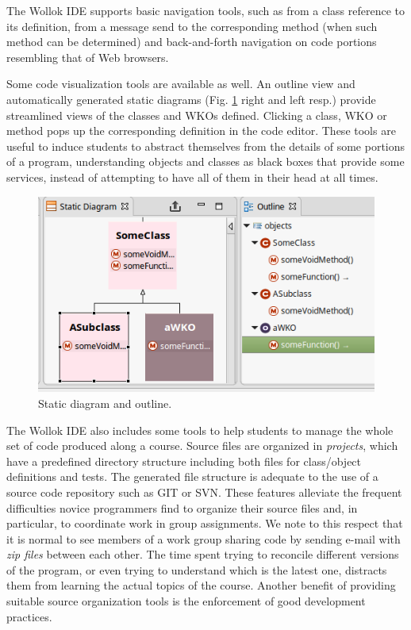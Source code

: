 The Wollok IDE supports basic navigation tools, such as from a class reference to its definition, from a message send to the corresponding method (when such method can be determined) and back-and-forth navigation on code portions resembling that of Web browsers.

Some code visualization tools are available as well. 
An outline view and automatically generated static diagrams (\cf Fig. \ref{fig:outline} right and left resp.) provide streamlined views of the classes and WKOs defined. 
Clicking a class, WKO or method pops up the corresponding definition in the code editor.
These tools are useful to induce students to abstract themselves from the details of some portions of a program, 
understanding objects and classes as black boxes that provide some services, 
instead of attempting to have all of them in their head at all times. 

\begin{figure}[ht]
\vspace{-2mm}
\centering
\includegraphics[scale=0.45]{images/outline.png}
\vspace{-2mm}
\caption{Static diagram and outline.}
\label{fig:outline}
\vspace{-3mm}
\end{figure}

The Wollok IDE also includes some tools to help students to manage the whole set of code produced along a course.
Source files are organized in \emph{projects}, which have a predefined directory structure including both files for class/object definitions and tests.
The generated file structure is adequate to the use of a source code repository such as GIT or SVN.
These features alleviate the frequent difficulties novice programmers find to organize their source files and, in particular, to coordinate work in group assignments.
We note to this respect that it is normal to see members of a work group sharing code by sending e-mail with \emph{zip files} between each other.
The time spent trying to reconcile different versions of the program, or even trying to understand which is the latest one, distracts them from learning the actual topics of the course.
Another benefit of providing suitable source organization tools is the enforcement of good development practices.

